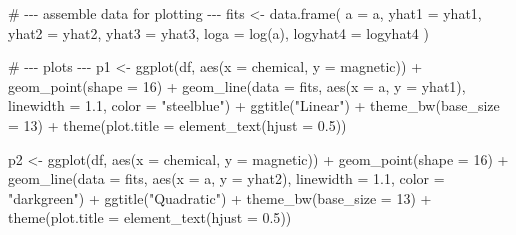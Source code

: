 \documentclass[
  letterpaper,
  DIV=11,
  numbers=noendperiod]{scrreprt}
\newenvironment{Shaded}{\begin{snugshade}}{\end{snugshade}}
\newcommand{\AttributeTok}[1]{\textcolor[rgb]{0.40,0.45,0.13}{#1}}
\newcommand{\CommentTok}[1]{\textcolor[rgb]{0.37,0.37,0.37}{#1}}
\newcommand{\DecValTok}[1]{\textcolor[rgb]{0.68,0.00,0.00}{#1}}
\newcommand{\FloatTok}[1]{\textcolor[rgb]{0.68,0.00,0.00}{#1}}
\newcommand{\FunctionTok}[1]{\textcolor[rgb]{0.28,0.35,0.67}{#1}}
\newcommand{\NormalTok}[1]{\textcolor[rgb]{0.00,0.23,0.31}{#1}}
\newcommand{\OtherTok}[1]{\textcolor[rgb]{0.00,0.23,0.31}{#1}}
\newcommand{\SpecialCharTok}[1]{\textcolor[rgb]{0.37,0.37,0.37}{#1}}
\newcommand{\StringTok}[1]{\textcolor[rgb]{0.13,0.47,0.30}{#1}}
\begin{document}
\begin{Shaded}
\begin{Highlighting}[]
\CommentTok{\# {-}{-}{-} assemble data for plotting {-}{-}{-}}
\NormalTok{fits }\OtherTok{\textless{}{-}} \FunctionTok{data.frame}\NormalTok{(}
  \AttributeTok{a =}\NormalTok{ a,}
  \AttributeTok{yhat1 =}\NormalTok{ yhat1,}
  \AttributeTok{yhat2 =}\NormalTok{ yhat2,}
  \AttributeTok{yhat3 =}\NormalTok{ yhat3,}
  \AttributeTok{loga  =} \FunctionTok{log}\NormalTok{(a),}
  \AttributeTok{logyhat4 =}\NormalTok{ logyhat4}
\NormalTok{)}

\CommentTok{\# {-}{-}{-} plots {-}{-}{-}}
\NormalTok{p1 }\OtherTok{\textless{}{-}} \FunctionTok{ggplot}\NormalTok{(df, }\FunctionTok{aes}\NormalTok{(}\AttributeTok{x =}\NormalTok{ chemical, }\AttributeTok{y =}\NormalTok{ magnetic)) }\SpecialCharTok{+}
  \FunctionTok{geom\_point}\NormalTok{(}\AttributeTok{shape =} \DecValTok{16}\NormalTok{) }\SpecialCharTok{+}
  \FunctionTok{geom\_line}\NormalTok{(}\AttributeTok{data =}\NormalTok{ fits, }\FunctionTok{aes}\NormalTok{(}\AttributeTok{x =}\NormalTok{ a, }\AttributeTok{y =}\NormalTok{ yhat1), }\AttributeTok{linewidth =} \FloatTok{1.1}\NormalTok{, }\AttributeTok{color =} \StringTok{"steelblue"}\NormalTok{) }\SpecialCharTok{+}
  \FunctionTok{ggtitle}\NormalTok{(}\StringTok{"Linear"}\NormalTok{) }\SpecialCharTok{+}
  \FunctionTok{theme\_bw}\NormalTok{(}\AttributeTok{base\_size =} \DecValTok{13}\NormalTok{) }\SpecialCharTok{+}
  \FunctionTok{theme}\NormalTok{(}\AttributeTok{plot.title =} \FunctionTok{element\_text}\NormalTok{(}\AttributeTok{hjust =} \FloatTok{0.5}\NormalTok{))}

\NormalTok{p2 }\OtherTok{\textless{}{-}} \FunctionTok{ggplot}\NormalTok{(df, }\FunctionTok{aes}\NormalTok{(}\AttributeTok{x =}\NormalTok{ chemical, }\AttributeTok{y =}\NormalTok{ magnetic)) }\SpecialCharTok{+}
  \FunctionTok{geom\_point}\NormalTok{(}\AttributeTok{shape =} \DecValTok{16}\NormalTok{) }\SpecialCharTok{+}
  \FunctionTok{geom\_line}\NormalTok{(}\AttributeTok{data =}\NormalTok{ fits, }\FunctionTok{aes}\NormalTok{(}\AttributeTok{x =}\NormalTok{ a, }\AttributeTok{y =}\NormalTok{ yhat2), }\AttributeTok{linewidth =} \FloatTok{1.1}\NormalTok{, }\AttributeTok{color =} \StringTok{"darkgreen"}\NormalTok{) }\SpecialCharTok{+}
  \FunctionTok{ggtitle}\NormalTok{(}\StringTok{"Quadratic"}\NormalTok{) }\SpecialCharTok{+}
  \FunctionTok{theme\_bw}\NormalTok{(}\AttributeTok{base\_size =} \DecValTok{13}\NormalTok{) }\SpecialCharTok{+}
  \FunctionTok{theme}\NormalTok{(}\AttributeTok{plot.title =} \FunctionTok{element\_text}\NormalTok{(}\AttributeTok{hjust =} \FloatTok{0.5}\NormalTok{))}


\end{Highlighting}
\end{Shaded}
\end{document}
